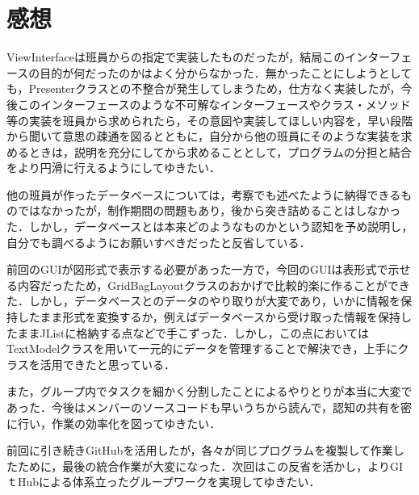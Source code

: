 \documentclass[12pt]{jarticle}
\begin{document}
\section{感想}
ViewInterfaceは班員からの指定で実装したものだったが，結局このインターフェースの目的が何だったのかはよく分からなかった．無かったことにしようとしても，Presenterクラスとの不整合が発生してしまうため，仕方なく実装したが，今後このインターフェースのような不可解なインターフェースやクラス・メソッド等の実装を班員から求められたら，その意図や実装してほしい内容を，早い段階から聞いて意思の疎通を図るとともに，自分から他の班員にそのような実装を求めるときは，説明を充分にしてから求めることとして，プログラムの分担と結合をより円滑に行えるようにしてゆきたい．

他の班員が作ったデータベースについては，考察でも述べたように納得できるものではなかったが，制作期間の問題もあり，後から突き詰めることはしなかった．しかし，データベースとは本来どのようなものかという認知を予め説明し，自分でも調べるようにお願いすべきだったと反省している．

前回のGUIが図形式で表示する必要があった一方で，今回のGUIは表形式で示せる内容だったため，GridBagLayoutクラスのおかげで比較的楽に作ることができた．しかし，データベースとのデータのやり取りが大変であり，いかに情報を保持したまま形式を変換するか，例えばデータベースから受け取った情報を保持したままJListに格納する点などで手こずった．しかし，この点においてはTextModelクラスを用いて一元的にデータを管理することで解決でき，上手にクラスを活用できたと思っている．

また，グループ内でタスクを細かく分割したことによるやりとりが本当に大変であった．今後はメンバーのソースコードも早いうちから読んで，認知の共有を密に行い，作業の効率化を図ってゆきたい．

前回に引き続きGitHubを活用したが，各々が同じプログラムを複製して作業したために，最後の統合作業が大変になった．次回はこの反省を活かし，よりGIｔHubによる体系立ったグループワークを実現してゆきたい．
\end{document}
